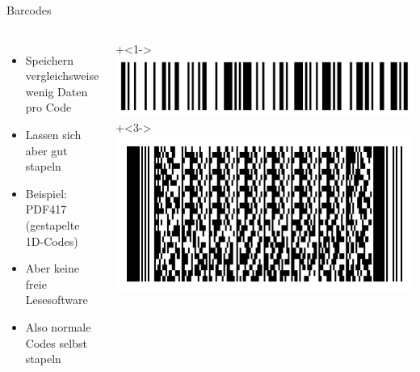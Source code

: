 \begin{frame}{Barcodes}
	\begin{columns}
		\begin{itemize}
		\item<1-> Speichern vergleichsweise wenig Daten pro Code
		\item<2-> Lassen sich aber gut stapeln
		\item<3-> Beispiel: PDF417 (gestapelte 1D-Codes)
		\item<4-> Aber keine freie Lesesoftware
		\item<5-> Also normale Codes selbst stapeln
		\end{itemize}
		\onslide+<1->\includegraphics[width=\textwidth]{penma/codes/128-chaosdorf.pdf}
		\vspace{1em}
		\onslide+<3->\includegraphics[width=\textwidth]{penma/codes/417.png}
	\end{columns}
\end{frame}

